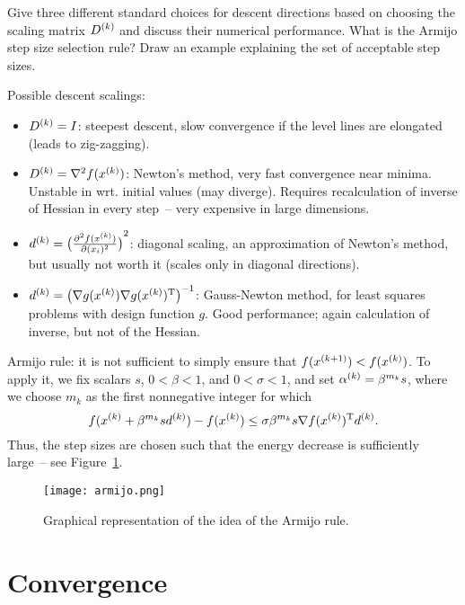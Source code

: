 \documentclass{article}
\begin{document}
\begin{question}
  Give three different standard choices for descent directions based on choosing the scaling matrix
  \(\kth{D}\) and discuss their numerical performance. What is the Armijo step size selection
  rule? Draw an example explaining the set of acceptable step sizes.
\end{question}
Possible descent scalings:
\begin{itemize}
\item \(\kth{D} = I\): steepest descent, slow convergence if the level lines are elongated (leads to
  zig-zagging).
\item \(\kth{D} = \nabla^2 f(\kth{x})\): Newton's method, very fast convergence near minima.  Unstable in
  wrt. initial values (may diverge). Requires recalculation of inverse of Hessian in every step~--
  very expensive in large dimensions.
\item \(\kth{d} = \del[1]{\pd[2]{f(\kth{x})}{(x_i)}}^2\): diagonal scaling, an approximation of
  Newton's method, but usually not worth it (scales only in diagonal directions).
\item \(\kth{d} = \del[1]{\nabla g(\kth{x}) \T{\nabla g(\kth{x})}}^{-1}\): Gauss-Newton method, for
  least squares problems with design function \(g\). Good performance; again calculation of inverse,
  but not of the Hessian.
\end{itemize}

Armijo rule: it is not sufficient to simply ensure that \(f(\kth[k+1]{x}) < f(\kth{x})\). To apply
it, we fix scalars \(s\), \(0 < \beta < 1\), and \(0 < \sigma < 1\), and set
\(\kth{\alpha} = \beta^{m_k} s\), where we choose \(m_k\) as the first nonnegative integer for which
\begin{equation*}
  f(\kth{x} + \beta^{m_k} s \kth{d}) - f(\kth{x}) \leq \sigma \beta^{m_k} s \nabla \T{f(\kth{x})} \kth{d}.
\end{equation*}
Thus, the step sizes are chosen such that the energy decrease is sufficiently large~-- see
Figure~\ref{fig:armijo}.
\begin{figure}[H]
  \centering
  \texttt{[image: armijo.png]}
  \caption{Graphical representation of the idea of the Armijo rule.\label{fig:armijo}}
\end{figure}


\section{Convergence}
\end{document}
